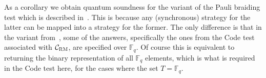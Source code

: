 \documentclass[11pt]{article}
\theoremstyle{definition}
\newcommand{\code}{\mathcal{C}}
\newcommand{\F}{\ensuremath{\mathbb{F}}}
\newcommand{\RM}{\ensuremath{\textsc{RM}}}
\begin{document}
As a corollary we obtain quantum soundness for the variant of the Pauli braiding test which is described in~\cite[Section 7.3]{ji2020mip}. This is because any (synchronous) strategy for the latter can be mapped into a strategy for the former. The only difference is that in the variant from~\cite{ji2020mip}, some of the answers, specifically the ones from the Code test associated with $\code_\RM$, are specified over $\F_q$. Of course this is equivalent to returning the binary representation of all $\F_q$ elements, which is what is required in the Code test here, for the cases where the set $T=\F_q$. 





\notesendofpaper
\end{document}

